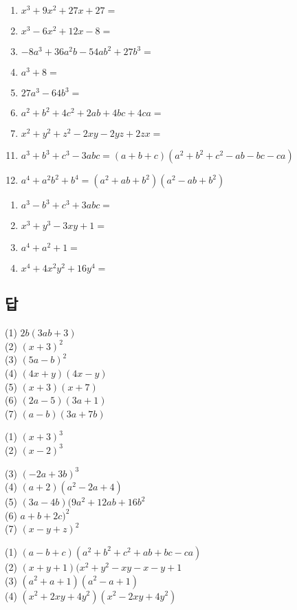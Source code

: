 \documentclass{oblivoir}
\begin{document}
%
\begin{enumerate}[(1)]
\item
\(x^3+9x^2+27x+27=\)
\item
\(x^3-6x^2+12x-8=\)
\item
\(-8a^3+36a^2b-54ab^2+27b^3=\)
\item
\(a^3+8=\)
\item
\(27a^3-64b^3=\)
\item
\(a^2+b^2+4c^2+2ab+4bc+4ca=\)
\item
\(x^2+y^2+z^2-2xy-2yz+2zx=\)
\end{enumerate}

\newpage
%
\begin{mdframed}
\begin{enumerate}[(1)]
\setcounter{enumi}{10}
\item
\(a^3+b^3+c^3-3abc=(a+b+c)(a^2+b^2+c^2-ab-bc-ca)\)
\item
\(a^4+a^2b^2+b^4=(a^2+ab+b^2)(a^2-ab+b^2)\)
\end{enumerate}
\end{mdframed}

%
\begin{enumerate}[(1)]
\item
\(a^3-b^3+c^3+3abc=\)
\item
\(x^3+y^3-3xy+1=\)
\item
\(a^4+a^2+1=\)
\item
\(x^4+4x^2y^2+16y^4=\)
\end{enumerate}

\vspace{70pt}

\subsection*{답}

\begin{minipage}{0.49\textwidth}
%
(1) \(2b(3ab+3)\)\\
(2) \((x+3)^2\)\\
(3) \((5a-b)^2\)\\
(4) \((4x+y)(4x-y)\)\\
(5) \((x+3)(x+7)\)\\
(6) \((2a-5)(3a+1)\)\\
(7) \((a-b)(3a+7b)\)

%
(1) \((x+3)^3\)\\
(2) \((x-2)^3\)\\
\end{minipage}
\begin{minipage}{0.49\textwidth}
(3) \((-2a+3b)^3\)\\
(4) \((a+2)(a^2-2a+4)\)\\
(5) \((3a-4b)(9a^2+12ab+16b^2\)\\
(6) \(a+b+2c)^2\)\\
(7) \((x-y+z)^2\)

%
(1) \((a-b+c)(a^2+b^2+c^2+ab+bc-ca)\)\\
(2) \((x+y+1)(x^2+y^2-xy-x-y+1\)\\
(3) \((a^2+a+1)(a^2-a+1)\)\\
(4) \((x^2+2xy+4y^2)(x^2-2xy+4y^2)\)
\end{minipage}
\end{document}
